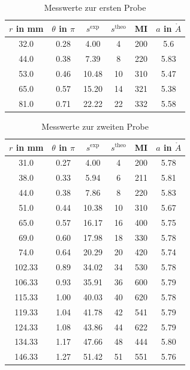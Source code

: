 \begin{table}[H]
 \begin{tabular}{cccccc}
$r$ in mm&	$\theta$ in $\pi$& $s^\text{exp}$& $s^\text{theo}$ & MI &$a$ in $\mathring{A}$\\
 \hline
32.0&	0.28&	4.00&	4&	200&	5.6\\
44.0&	0.38&	7.39&	8&	220&	5.83\\
53.0&	0.46&	10.48&	10&	310&	5.47\\
65.0&	0.57&	15.20&	14&	321&	5.38\\
81.0&	0.71&	22.22&	22&	332&	5.58 \\
  
 \end{tabular}
 \caption{Messwerte zur ersten Probe}
 \label{tab:messreihe1}

\end{table}

\begin{table}[H]
 \begin{tabular}{cccccc}
$r$ in mm&	$\theta$ in $\pi$& $s^\text{exp}$& $s^\text{theo}$ & MI &$a$ in $\mathring{A}$\\
\hline
31.0&	0.27&	4.00&	4&	200&	5.78\\
38.0&	0.33&	5.94&	6&	211&	5.81\\
44.0&	0.38&	7.86&	8&	220&	5.83\\
51.0&	0.44&	10.38&	10&	310&	5.67\\
65.0&	0.57&	16.17&	16&	400&	5.75\\
69.0&	0.60&	17.98&	18&	330&	5.78\\
74.0&	0.64&	20.29&	20&	420&	5.74\\
102.33&	0.89&	34.02&	34&	530&	5.78\\
106.33&	0.93&	35.91&	36&	600&	5.79\\
115.33&	1.00&	40.03&	40&	620&	5.78\\
119.33&	1.04&	41.78&	42&	541&	5.79\\
124.33&	1.08&	43.86&	44&	622&	5.79\\
134.33&	1.17&	47.66&	48&	444&	5.80\\
146.33&	1.27&	51.42&	51&	551&	5.76\\
  
 \end{tabular}
 \caption{Messwerte zur zweiten Probe}
 \label{tab:messreihe2}

\end{table}

